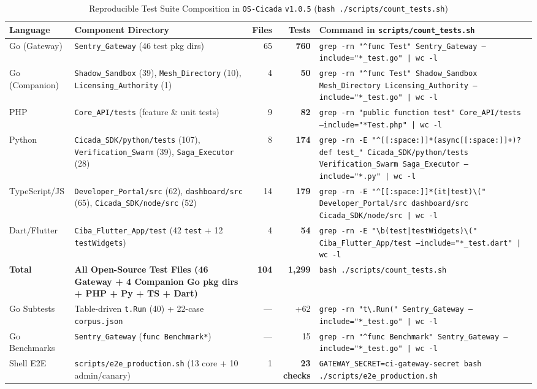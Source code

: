 \documentclass[11pt, a4paper]{article}
\begin{document}
\begin{table}[htbp]
\centering
\caption{Reproducible Test Suite Composition in \texttt{OS-Cicada} \texttt{v1.0.5} (\texttt{bash ./scripts/count\_tests.sh})}
\label{tab:test-suite}
\begin{small}
\begin{tabular}{@{} l l r r p{5.8cm} @{}}
\toprule
\textbf{Language} & \textbf{Component Directory} & \textbf{Files} & \textbf{Tests} & \textbf{Command in \texttt{scripts/count\_tests.sh}} \\
\midrule
Go (Gateway)   & \texttt{Sentry\_Gateway} (46 test pkg dirs)              & 65 & \textbf{760} & \texttt{grep -rn "\^{}func Test" Sentry\_Gateway --include="*\_test.go" | wc -l} \\
Go (Companion) & \texttt{Shadow\_Sandbox} (39), \texttt{Mesh\_Directory} (10), \texttt{Licensing\_Authority} (1) & 4 & \textbf{50} & \texttt{grep -rn "\^{}func Test" Shadow\_Sandbox Mesh\_Directory Licensing\_Authority --include="*\_test.go" | wc -l} \\
PHP            & \texttt{Core\_API/tests} (feature \& unit tests)         & 9  & \textbf{82}  & \texttt{grep -rn "public function test" Core\_API/tests --include="*Test.php" | wc -l} \\
Python         & \texttt{Cicada\_SDK/python/tests} (107), \texttt{Verification\_Swarm} (39), \texttt{Saga\_Executor} (28) & 8 & \textbf{174} & \texttt{grep -rn -E "\^{}[[:space:]]*(async[[:space:]]+)?def test\_" Cicada\_SDK/python/tests Verification\_Swarm Saga\_Executor --include="*.py" | wc -l} \\
TypeScript/JS  & \texttt{Developer\_Portal/src} (62), \texttt{dashboard/src} (65), \texttt{Cicada\_SDK/node/src} (52) & 14 & \textbf{179} & \texttt{grep -rn -E "\^{}[[:space:]]*(it|test)\textbackslash(" Developer\_Portal/src dashboard/src Cicada\_SDK/node/src | wc -l} \\
Dart/Flutter   & \texttt{Ciba\_Flutter\_App/test} (42 \texttt{test} + 12 \texttt{testWidgets}) & 4 & \textbf{54} & \texttt{grep -rn -E "\textbackslash b(test|testWidgets)\textbackslash(" Ciba\_Flutter\_App/test --include="*\_test.dart" | wc -l} \\
\midrule
\textbf{Total} & \textbf{All Open-Source Test Files (46 Gateway + 4 Companion Go pkg dirs + PHP + Py + TS + Dart)} & \textbf{104} & \textbf{1,299} & \texttt{bash ./scripts/count\_tests.sh} \\
\midrule
Go Subtests    & Table-driven \texttt{t.Run} (40) + 22-case \texttt{corpus.json} & — & +62 & \texttt{grep -rn "t\textbackslash.Run(" Sentry\_Gateway --include="*\_test.go" | wc -l} \\
Go Benchmarks  & \texttt{Sentry\_Gateway} (\texttt{func Benchmark*})      & —  & 15  & \texttt{grep -rn "\^{}func Benchmark" Sentry\_Gateway --include="*\_test.go" | wc -l} \\
Shell E2E      & \texttt{scripts/e2e\_production.sh} (13 core + 10 admin/canary) & 1 & \textbf{23 checks} & \texttt{GATEWAY\_SECRET=ci-gateway-secret bash ./scripts/e2e\_production.sh} \\
\bottomrule
\end{tabular}
\end{small}
\end{table}
\end{document}
